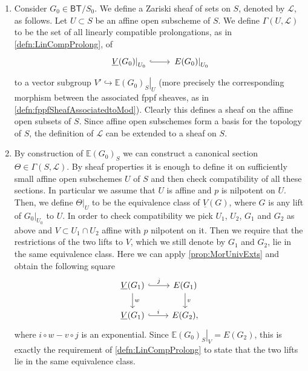 \begin{rem}[]\leavevmode\vspace{-.2\baselineskip}
\begin{enumerate}
	\item Consider $G_0 \in \mathsf{BT}/S_0$.
		We define a Zariski sheaf of sets on $S$, denoted by $\mathscr{L}$,
		as follows.
		Let $U \subset S$ be an affine open subscheme of $S$.
		We define $\Gamma(U,\mathscr{L})$ to be the set of all linearly compatible prolongations,
		as in \cref{defn:LinCompProlong}, of
		\begin{equation*}
		\begin{tikzcd}[row sep = 0ex
			,/tikz/column 1/.append style={anchor=base east}
			,/tikz/column 2/.append style={anchor=base west}]
			\left.\underline{V}(G_0)\right|_{U_0} \arrow[r, "", hookrightarrow] &
			\left.E(G_0)\right|_{U_0}
		\end{tikzcd}
		\end{equation*} 
		to a vector subgroup $V' \hookrightarrow \left.\mathbb{E}(G_0)_S\right|_{U}$
		(more precisely the corresponding morphism between the associated
		fppf sheaves, as in \cref{defn:fppfSheafAssociatedtoMod}).
		Clearly this defines a sheaf on the affine open subsets of $S$.
		Since affine open subschemes form a basis for the topology of $S$, the definition
		of $\mathscr{L}$ can be extended to a sheaf on $S$.

	\item By construction of $\mathbb{E}(G_0)_S$ we can construct a canonical
		section $\Theta \in \Gamma(S, \mathscr{L})$.
		By sheaf properties it is enough to define it on sufficiently small
		affine open subschemes $U$ of $S$ and then check compatibility of all
		these sections.
		In particular we assume that $U$ is affine and $p$ is nilpotent on $U$.
		Then, we define $\left.\Theta\right|_{ U }$ to be the equivalence class
		of $\underline{V}(G)$, where $G$ is any lift of $\left.G_0\right|_{ U_0 }$
		to $U$.
		In order to check compatibility we pick $U_1$, $U_2$, $G_1$ and $G_2$
		as above and $V \subset U_1 \cap U_2$ affine
		with $p$ nilpotent on it.
		Then we require that the restrictions of the two lifts to $V$,
		which we still denote by $G_1$ and $G_2$, lie in the same equivalence class.
		Here we can apply \cref{prop:MorUnivExts} and obtain the following
		square
		\begin{equation*}
		\begin{tikzcd}
			\underline{V}(G_1) \arrow[r, "j", hookrightarrow] 
			\arrow[d, "w", rightarrow] &
			E(G_1) \arrow[d, "v", rightarrow] \\
			\underline{V}(G_1) \arrow[r, "i", hookrightarrow] &
			E(G_2)
		,\end{tikzcd}
		\end{equation*}
		where $i \circ w - v \circ j$ is an exponential.
		Since $\left.\mathbb{E}(G_0)_S\right|_{ V } = E(G_2)$,
		this is exactly the requirement of \cref{defn:LinCompProlong} 
		to state that the two lifts lie in the same equivalence class.


\end{enumerate}
\end{rem}
